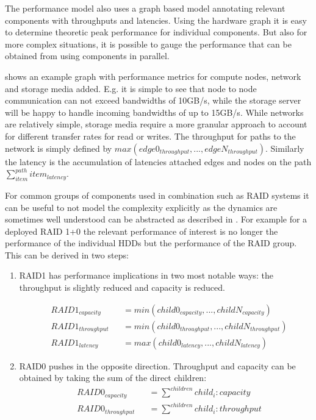 \documentclass{../../template/esiwace-report}
\begin{document}
The performance model also uses a  graph based model annotating relevant components with throughputs and latencies.
Using the hardware graph it is easy to determine theoretic peak performance for individual components.
But also for more complex situations, it is possible to gauge the performance that can be obtained from using components in parallel.

 shows an example graph with performance metrics for compute nodes, network and storage media added. E.g. it is simple to see that node to node communication can not exceed bandwidths of 10GB/s, while the storage server will be happy to handle incoming bandwidths of up to 15GB/s.
While networks are relatively simple, storage media require a more granular approach to account for different transfer rates for read or writes.
The throughput for paths to the network is simply defined by $max(edge0_{throughput}, ..., edgeN_{throughput})$.
Similarly the latency is the accumulation of latencies attached edges and nodes on the path $\sum_{item}^{path}{item_{latency}}$.

For common groups of components used in combination such as RAID systems it can be useful to not model the complexity explicitly as the dynamics are sometimes well understood can be abstracted as described in \cite{kunkel_iopmmodeling_2012}.
For example for a deployed RAID 1+0 the relevant performance of interest is no longer the performance of the individual HDDs but the performance of the RAID group.
This can be derived in two steps:

\begin{enumerate}
	\item RAID1 has performance implications in two most notable ways: the throughput is slightly reduced and capacity is reduced.

\begin{align}
	 & RAID1_{capacity}   &  & = min(child0_{capacity}, ..., childN_{capacity})     \\
	 & RAID1_{throughput} &  & = min(child0_{throughput}, ..., childN_{throughput}) \\
	 & RAID1_{latency}    &  & = max(child0_{latency}, ..., childN_{latency})
\end{align}


	\item RAID0 pushes in the opposite direction. Throughput and capacity can be obtained by taking the sum of the direct children:
\begin{align}
	 & RAID0_{capacity}   &  & = \sum^{children}{child_i:capacity}   \\
	 & RAID0_{throughput} &  & = \sum^{children}{child_i:throughput}
\end{align}
\end{enumerate}
\end{document}
